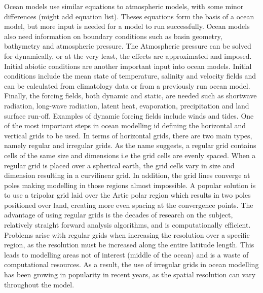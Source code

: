 \documentclass[
]{article}
\begin{document}
Ocean models use similar equations to atmospheric models, with some
minor differences (might add equation list). Theses equations form the
basis of a ocean model, but more input is needed for a model to run
successfully. Ocean models also need information on boundary conditions
such as basin geometry, bathymetry and atmospheric pressure. The
Atmospheric pressure can be solved for dynamically, or at the very
least, the effects are approximated and imposed. Initial abiotic
conditions are another important input into ocean models. Initial
conditions include the mean state of temperature, salinity and velocity
fields and can be calculated from climatology data or from a previously
run ocean model. Finally, the forcing fields, both dynamic and static,
are needed such as shortwave radiation, long-wave radiation, latent
heat, evaporation, precipitation and land surface run-off. Examples of
dynamic forcing fields include winds and tides. One of the most
important steps in ocean modelling id defining the horizontal and
vertical grids to be used. In terms of horizontal grids, there are two
main types, namely regular and irregular grids. As the name suggests, a
regular grid contains cells of the same size and dimensions i.e the grid
cells are evenly spaced. When a regular grid is placed over a spherical
earth, the grid cells vary in size and dimension resulting in a
curvilinear grid. In addition, the grid lines converge at poles making
modelling in those regions almost impossible. A popular solution is to
use a tripolar grid laid over the Artic polar region which results in
two poles positioned over land, creating more even spacing at the
convergence points. The advantage of using regular grids is the decades
of research on the subject, relatively straight forward analysis
algorithms, and is computationally efficient. Problems arise with
regular grids when increasing the resolution over a specific region, as
the resolution must be increased along the entire latitude length. This
leads to modelling areas not of interest (middle of the ocean) and is a
waste of computational resources. As a result, the use of irregular
grids in ocean modelling has been growing in popularity in recent years,
as the spatial resolution can vary throughout the model.
\end{document}
